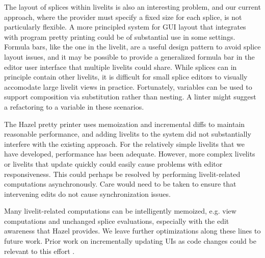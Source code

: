 The layout of splices within livelits is also an interesting problem, and our current approach, where 
the provider must specify a fixed size for each splice, is not particularly flexible. 
A more principled system for GUI layout that integrates with program pretty 
printing could be of substantial use in some settings. Formula bars, like the one in the 
livelit, are a useful design pattern to avoid splice layout issues, and it may be possible to provide 
a generalized formula bar in the editor user interface that multiple livelits could share.
While splices can in principle contain other livelits, it is difficult for small splice editors to 
visually accomodate large livelit views in practice. 
Fortunately, variables can be used to support composition via substitution 
rather than nesting. A linter might suggest a refactoring to a variable in these scenarios.

The Hazel pretty printer uses memoization and incremental diffs to maintain reasonable performance,
and adding livelits to the system did not substantially interfere with the existing approach.
For the relatively simple livelits that we have developed, performance has been adequate.
However, more complex  livelits or livelits that update quickly 
could easily cause problems with editor responsiveness.
This could perhaps be resolved by performing livelit-related computations asynchronously. Care 
would need to be taken to ensure that intervening edits do not cause synchronization issues.

Many livelit-related computations can be intelligently memoized, e.g. view computations and unchanged splice evaluations,
especially with the edit awareness that Hazel provides. 
We leave further optimizations along these lines to future work.
Prior work on incrementally updating UIs as code changes could be relevant to this effort \cite{burckhardt2013s}.